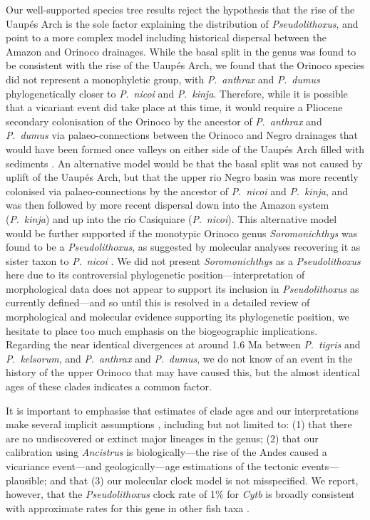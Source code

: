 \documentclass[12pt]{article}
\begin{document}
Our well-supported species tree results reject the hypothesis that the rise of the Uaupés Arch is the sole factor explaining the distribution of \emph{Pseudolithoxus}, and point to a more complex model including historical dispersal between the Amazon and Orinoco drainages. %
While the basal split in the genus was found to be consistent with the rise of the Uaupés Arch, we found that the Orinoco species did not represent a monophyletic group, with \emph{P}.\ \emph{anthrax} and \emph{P}.\ \emph{dumus} phylogenetically closer to \emph{P}.\ \emph{nicoi} and \emph{P}.\ \emph{kinja}. %
Therefore, while it is possible that a vicariant event did take place at this time, it would require a Pliocene secondary colonisation of the Orinoco by the ancestor of \emph{P}.\ \emph{anthrax} and \emph{P}.\ \emph{dumus} via palaeo-connections between the Orinoco and Negro drainages that would have been formed once valleys on either side of the Uaupés Arch filled with sediments \citep{Winemiller2011}. %
An alternative model would be that the basal split was not caused by uplift of the Uaupés Arch, but that the upper rio Negro basin was more recently colonised via palaeo-connections by the ancestor of \emph{P}.\ \emph{nicoi} and \emph{P}.\ \emph{kinja}, and was then followed by more recent dispersal down into the Amazon system (\emph{P}.\ \emph{kinja}) and up into the río Casiquiare (\emph{P}.\ \emph{nicoi}). %
This alternative model would be further supported if the monotypic Orinoco genus \emph{Soromonichthys} was found to be a \emph{Pseudolithoxus}, as suggested by molecular analyses recovering it as sister taxon to \emph{P}.\ \emph{nicoi} \citep[][exploratory analyses this study]{Lujan2015phylo}. %
We did not present \emph{Soromonichthys} as a \emph{Pseudolithoxus} here due to its controversial phylogenetic position---interpretation of morphological data does not appear to support its inclusion in \emph{Pseudolithoxus} as currently defined---and so until this is resolved in a detailed review of morphological and molecular evidence supporting its phylogenetic position, we hesitate to place too much emphasis on the biogeographic implications. %
Regarding the near identical divergences at around 1.6 Ma between \emph{P}.\ \emph{tigris} and \emph{P}.\ \emph{kelsorum}, and \emph{P}.\ \emph{anthrax} and \emph{P}.\ \emph{dumus}, we do not know of an event in the history of the upper Orinoco that may have caused this, but the almost identical ages of these clades indicates a common factor.%

It is important to emphasise that estimates of clade ages and our interpretations make several implicit assumptions \citep[e.g.][]{Duchene2014,Ho2014,Lovejoy2010}, including but not limited to: (1) that there are no undiscovered or extinct major lineages in the genus; (2) that our calibration using \emph{Ancistrus} is biologically---the rise of the Andes caused a vicariance event---and geologically---age estimations of the tectonic events---plausible; and that (3) our molecular clock model is not misspecified. %
We report, however, that the \emph{Pseudolithoxus} clock rate of 1\% for \emph{Cytb} is broadly consistent with approximate rates for this gene in other fish taxa \citep[e.g.\ 0.74-0.92\%;][]{Ruber2004}.%
\end{document}
